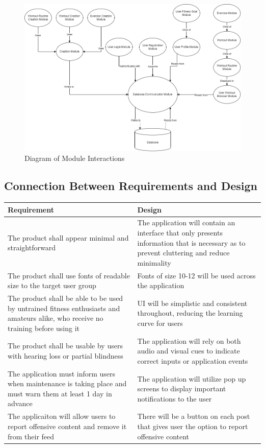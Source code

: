 \documentclass[12pt, titlepage]{article}
\begin{document}
	\begin{figure}[H]
		\centering
		\includegraphics[width=\linewidth,keepaspectratio]{component_diagram}
    \caption{Diagram of Module Interactions}
	\end{figure}
	
	\subsection{Connection Between Requirements and Design} \label{SecConnection}
	
\begin{tabular}{ | m{20em} | m{20em} | }
		\hline
		Requirement & Design \\
		\hline
		The product shall appear minimal and straightforward & The application will contain an interface that only presents information that is necessary as to prevent cluttering and reduce minimality \\
		\hline
		The product shall use fonts of readable size to the target user group & Fonts of size 10-12 will be used across the application \\
		\hline
		The product shall be able to be used by untrained fitness enthusiasts and amateurs alike, who receive no training before using it & UI will be simplistic and consistent throughout, reducing the learning curve for users \\
		\hline
		The product shall be usable by users with hearing loss or partial blindness & The application will rely on both audio and visual cues to indicate correct inputs or application events \\
		\hline
		The application must inform users when maintenance is taking place and must warn them at least 1 day in advance & The application will utilize pop up screens to display important notifications to the user \\
		\hline
		The applicaiton will allow users to report offensive content and remove it from their feed & There will be a button on each post that gives user the option to report offensive content \\
		\hline

	\end{tabular}
	
\end{document}
